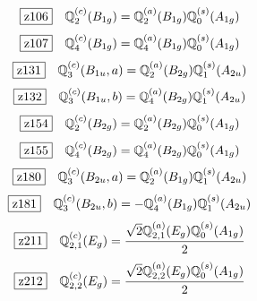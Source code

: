\documentclass[fleqn,10pt,landscape]{jsarticle}
\begin{document}
\begin{dmath*}
\hspace*{3mm}\fbox{z106}\quad \mathbb{Q}_{2}^{(c)}(B_{1g})=\mathbb{Q}_{2}^{(a)}(B_{1g}) \mathbb{Q}_{0}^{(s)}(A_{1g})
\end{dmath*}
\begin{dmath*}
\hspace*{3mm}\fbox{z107}\quad \mathbb{Q}_{4}^{(c)}(B_{1g})=\mathbb{Q}_{4}^{(a)}(B_{1g}) \mathbb{Q}_{0}^{(s)}(A_{1g})
\end{dmath*}
\begin{dmath*}
\hspace*{3mm}\fbox{z131}\quad \mathbb{Q}_{3}^{(c)}(B_{1u},a)=\mathbb{Q}_{2}^{(a)}(B_{2g}) \mathbb{Q}_{1}^{(s)}(A_{2u})
\end{dmath*}
\begin{dmath*}
\hspace*{3mm}\fbox{z132}\quad \mathbb{Q}_{3}^{(c)}(B_{1u},b)=\mathbb{Q}_{4}^{(a)}(B_{2g}) \mathbb{Q}_{1}^{(s)}(A_{2u})
\end{dmath*}
\begin{dmath*}
\hspace*{3mm}\fbox{z154}\quad \mathbb{Q}_{2}^{(c)}(B_{2g})=\mathbb{Q}_{2}^{(a)}(B_{2g}) \mathbb{Q}_{0}^{(s)}(A_{1g})
\end{dmath*}
\begin{dmath*}
\hspace*{3mm}\fbox{z155}\quad \mathbb{Q}_{4}^{(c)}(B_{2g})=\mathbb{Q}_{4}^{(a)}(B_{2g}) \mathbb{Q}_{0}^{(s)}(A_{1g})
\end{dmath*}
\begin{dmath*}
\hspace*{3mm}\fbox{z180}\quad \mathbb{Q}_{3}^{(c)}(B_{2u},a)=\mathbb{Q}_{2}^{(a)}(B_{1g}) \mathbb{Q}_{1}^{(s)}(A_{2u})
\end{dmath*}
\begin{dmath*}
\hspace*{3mm}\fbox{z181}\quad \mathbb{Q}_{3}^{(c)}(B_{2u},b)=- \mathbb{Q}_{4}^{(a)}(B_{1g}) \mathbb{Q}_{1}^{(s)}(A_{2u})
\end{dmath*}
\begin{dmath*}
\hspace*{3mm}\fbox{z211}\quad \mathbb{Q}_{2,1}^{(c)}(E_{g})=\frac{\sqrt{2} \mathbb{Q}_{2,1}^{(a)}(E_{g}) \mathbb{Q}_{0}^{(s)}(A_{1g})}{2}
\end{dmath*}
\begin{dmath*}
\hspace*{3mm}\fbox{z212}\quad \mathbb{Q}_{2,2}^{(c)}(E_{g})=\frac{\sqrt{2} \mathbb{Q}_{2,2}^{(a)}(E_{g}) \mathbb{Q}_{0}^{(s)}(A_{1g})}{2}
\end{dmath*}
\end{document}
